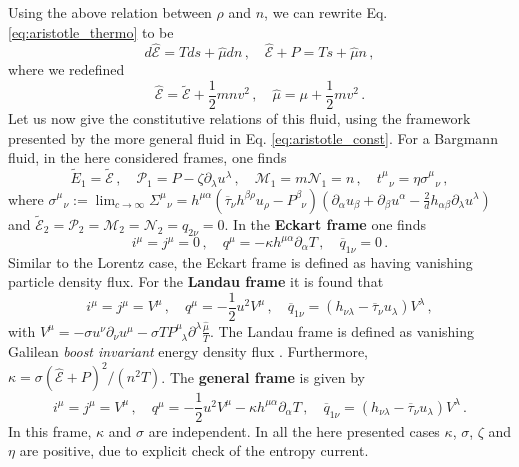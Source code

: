 \documentclass[superscriptaddress,prd,nofootinbib,preprintnumbers,longbibliography,11pt,eqsecnum]{revtex4-1}
\begin{document}
Using the above relation between $\rho$ and $n$, we can rewrite Eq. \eqref{eq:aristotle_thermo} to be
\begin{equation}
	d\hat{\mathcal{E}}
	=
	Tds
	+
	\hat{\mu} dn
	\,,
	\quad
	\hat{\mathcal{E}}
	+
	P
	=
	T
	s
	+
	\hat{\mu}
	n
	\,,
\end{equation}
where we redefined
\begin{equation}
	\hat{\mathcal{E}}
	=
	\tilde{\mathcal{E}}+\frac{1}{2}mnv^{2}
	\,,
	\quad
	\hat{\mu}
	=
	\mu
	+
	\frac{1}{2}mv^{2}
	\,.
\end{equation}
Let us now give the constitutive relations of this fluid, using the framework presented by the more general fluid in Eq. \eqref{eq:aristotle_const}. For a Bargmann fluid, in the here considered frames, one finds \cite{Jensen:2014ama}
\begin{equation}
	\tilde{E}_{1}
	=
	\tilde{\mathcal{E}}
	\,,
	\quad
	\mathcal{P}_{1}
	=
	P-\zeta\partial_{\lambda}u^{\lambda}
	\,,
	\quad
	\mathcal{M}_{1}
	=
	m
	\mathcal{N}_{1}
	=
	n
	\,,
	\quad
	t^{\mu}_{\;\;\,\nu}
	=
	\eta
	\sigma^{\mu}_{\;\;\,\nu}
	\,,
\end{equation}
where $\sigma^{\mu}_{\;\;\,\nu}:=\lim_{c\to\infty}\Sigma^{\mu}_{\;\;\,\nu}=h^{\mu\alpha}\left(\overline{\tau}_{\nu}h^{\beta\rho}u_{\rho}-P^{\beta}_{\;\;\nu}\right)\left(\partial_{\alpha}u_{\beta}+\partial_{\beta}u^{\alpha}-\frac{2}{d}h_{\alpha\beta}\partial_{\lambda}u^{\lambda}\right)$ and $\tilde{\mathcal{E}}_{2}=\mathcal{P}_{2}=\mathcal{M}_{2}=\mathcal{N}_{2}=q_{2\nu}=0$.
In the \textbf{Eckart frame} one finds
\begin{equation}
	i^{\mu}
	=
	j^{\mu}
	=
	0
	\,,
	\quad
	q^{\mu}
	=
	-\kappa h^{\mu\alpha}\partial_{\alpha}T
	\,,
	\quad
	\overline{q}_{1\nu}
	=
	0
	\,.
\end{equation}
Similar to the Lorentz case, the Eckart frame is defined as having vanishing particle density flux. For the \textbf{Landau frame} it is found that
\begin{equation}
	i^{\mu}
	=
	j^{\mu}
	=
	V^{\mu}
	\,,\quad
	q^{\mu}
	=
	-\frac{1}{2}u^{2}V^{\mu}
	\,,
	\quad
	\overline{q}_{1\nu}
	=
	\left(
		h_{\nu\lambda}
		-
		\overline{\tau}_{\nu}u_{\lambda}
	\right)V^{\lambda}
	\,,
\end{equation}
with $V^{\mu}=-\sigma u^{\nu}\partial_{\nu}u^{\mu}-\sigma T P^{\mu}_{\;\;\lambda}\partial^{\lambda}\frac{\hat{\mu}}{T}$.
The Landau frame is defined as vanishing Galilean \textit{boost invariant} energy density flux \cite{Jensen:2014ama}. Furthermore, $\kappa=\sigma(\hat{\mathcal{E}}+P)^{2}/(n^{2}T)$. 
The \textbf{general frame} is given by
\begin{equation}
	i^{\mu}
	=
	j^{\mu}
	=
	V^{\mu}
	\,,\quad
	q^{\mu}
	=
	-\frac{1}{2}u^{2}V^{\mu}
	-
	\kappa h^{\mu\alpha}\partial_{\alpha}T
	\,,
	\quad
	\overline{q}_{1\nu}
	=
	\left(
		h_{\nu\lambda}
		-
		\overline{\tau}_{\nu}u_{\lambda}
	\right)V^{\lambda}
	\,.
\end{equation}
In this frame, $\kappa$ and $\sigma$ are independent. In all the here presented cases $\kappa$, $\sigma$, $\zeta$ and $\eta$ are positive, due to explicit check of the entropy current.
\end{document}

